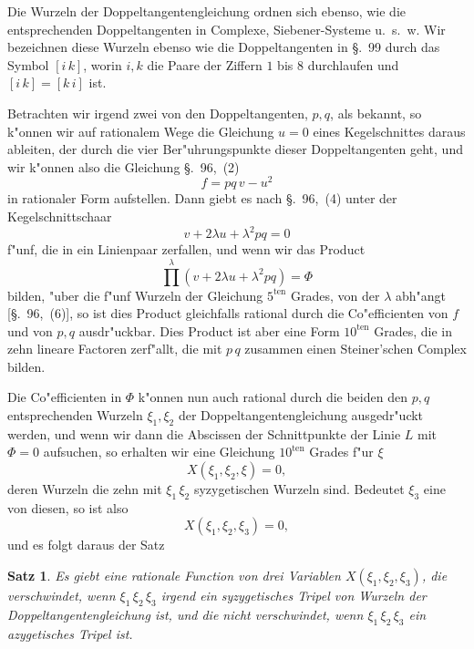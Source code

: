 \documentclass[12pt,a4paper]{article}
\theoremstyle{plain}
\newtheorem{satz}{Satz}[section]
\begin{document}
Die Wurzeln der Doppeltangentengleichung ordnen sich ebenso, wie die entsprechenden Doppeltangenten in Complexe, Siebener-Systeme u.~s.~w. Wir bezeichnen diese Wurzeln ebenso wie die Doppeltangenten in \S.~99 durch das Symbol $[i\,k]$, worin $i,k$ die Paare der Ziffern $1$ bis $8$ durchlaufen und $[i\,k]=[k\,i]$ ist.

Betrachten wir irgend zwei von den Doppeltangenten, $p,q$, als bekannt, so k"onnen wir auf rationalem Wege die Gleichung $u=0$ eines Kegelschnittes daraus ableiten, der durch die vier Ber"uhrungspunkte dieser Doppeltangenten geht, und wir k"onnen also die Gleichung \S.~96,~(2)
\[f = p q\,v - u^2\]
in rationaler Form aufstellen. Dann giebt es nach \S.~96,~(4) unter der Kegelschnittschaar
\[v + 2\lambda u + \lambda^2 p q = 0\]
f"unf, die in ein Linienpaar zerfallen, und wenn wir das Product
\[\prod^{\lambda}(v + 2\lambda u + \lambda^2 p q) = \Phi\]
bilden, "uber die f"unf Wurzeln der Gleichung $5^{\text{ten}}$ Grades, von der $\lambda$ abh"angt [\S.~96,~(6)], so ist dies Product gleichfalls rational durch die Co"efficienten von $f$ und von $p,q$ ausdr"uckbar. Dies Product ist aber eine Form $10^{\text{ten}}$ Grades, die in zehn lineare Factoren zerf"allt, die mit $p\,q$ zusammen einen Steiner'schen Complex bilden.

Die Co"efficienten in $\Phi$ k"onnen nun auch rational durch die beiden den $p,q$ entsprechenden Wurzeln $\xi_1, \xi_2$ der Doppeltangentengleichung ausgedr"uckt werden, und wenn wir dann die Abscissen der Schnittpunkte der Linie $L$ mit $\Phi=0$ aufsuchen, so erhalten wir eine Gleichung $10^{\text{ten}}$ Grades f"ur $\xi$
\[X(\xi_1, \xi_2, \xi) = 0,\]
deren Wurzeln die zehn mit $\xi_1\,\xi_2$ syzygetischen Wurzeln sind. Bedeutet $\xi_3$ eine von diesen, so ist also
\begin{equation}\tag{3}
X(\xi_1, \xi_2, \xi_3) = 0,
\end{equation}
und es folgt daraus der Satz

\begin{satz}
Es giebt eine rationale Function von drei Variablen $X(\xi_1, \xi_2, \xi_3)$, die verschwindet, wenn $\xi_1\,\xi_2\,\xi_3$ irgend ein syzygetisches Tripel von Wurzeln der Doppeltangentengleichung ist, und die nicht verschwindet, wenn $\xi_1\,\xi_2\,\xi_3$ ein azygetisches Tripel ist.
\end{satz}
\end{document}
